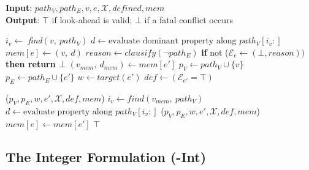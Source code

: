 \documentclass[a4paper,fleqn]{cas-sc}
\begin{document}
\begin{algorithm}[htb]
\caption{\textbf{\nocmemo}}
\small
\textbf{Input}: $path_V, path_E, v, e, \mathcal{X}, \textit{defined}, \textit{mem}$ \\
\textbf{Output}: $\top$ if look-ahead is valid; $\bot$ if a fatal conflict occurs
\begin{algorithmic}[1]
     \label{alg:nocmemo:pathcheck}
        \STATE $i_v \gets$ \textit{find}$(v,\ path_V)$ \label{alg:nocmemo:findcycle1}
        \STATE $d \gets \text{evaluate dominant property along } path_V[i_v:]$
        \STATE $\textit{mem}[e] \gets (v,\ d)$ \label{alg:nocmemo:update1}
         \label{alg:nocmemo:checkopponent}
            \STATE $\textit{reason} \gets \textit{clausify}(\neg path_E)$ \label{alg:nocmemo:reason}
            \STATE \textbf{if }not ($\mathcal{E}_e \gets (\bot, \textit{reason}))$ \textbf{then return $\bot$}
        \ENDIF
     \label{alg:nocmemo:defcheck}
            \STATE $(v_{mem},\ d_{mem}) \gets \textit{mem}[e']$
            \STATE $p_V \gets path_V \cup \{v\}$
            \STATE $p_E \gets path_E \cup \{e'\}$
            \STATE $w \gets \textit{target}(e')$
            \STATE $\textit{def} \gets (\mathcal{E}_{e'} = \top)$
 
                \STATE \nocmemo($p_V, p_E, w, e', \mathcal{X}, \textit{def}, \textit{mem}$)\label{alg:nocmemo:check1}
            \ELSE
                \STATE $i_v \gets \textit{find}(v_{mem},\ path_V)$ \label{alg:nocmemo:findcycle2}
                \STATE $d \gets \text{evaluate property along } path_V[i_v:]$
                    \STATE \nocmemo($p_V, p_E, w, e', \mathcal{X}, \textit{def}, \textit{mem}$)\label{alg:nocmemo:check2}
                \ELSE
                    \STATE $\textit{mem}[e] \gets \textit{mem}[e']$ \label{alg:nocmemo:update2}
                \ENDIF
            \ENDIF
        \ENDFOR
    \ENDIF
    \RETURN $\top$
\end{algorithmic}
\label{alg:nocmemo}
\end{algorithm}


\subsection{The Integer Formulation (\nooppc-Int)}\label{sec:noc_int}
\end{document}
